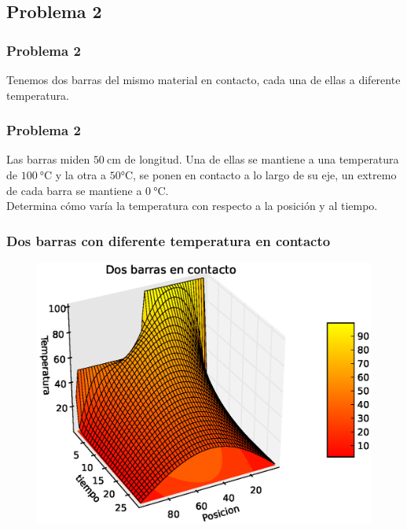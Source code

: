 \subsection{Problema 2}
\begin{frame}
\frametitle{Problema 2}
Tenemos dos barras del mismo material en contacto, cada una de ellas a diferente temperatura.
\end{frame}
\begin{frame}
\frametitle{Problema 2}
Las barras miden  $50 \: \si\cm$ de longitud. Una de ellas se mantiene a una temperatura de $100 \: \si\celsius$ y la otra a $50 \si\celsius$, se ponen en contacto a lo largo de su eje, un extremo de cada barra se mantiene a $0 \: \si\celsius$.
\\
\bigskip
Determina cómo varía la temperatura con respecto a la posición y al tiempo.
\end{frame}
\begin{frame}
\frametitle{Dos barras con diferente temperatura en contacto}
\begin{figure}
	\centering
	\includegraphics[scale=0.5]{Imagenes/EqCalor06.eps}  
\end{figure}
\end{frame}
